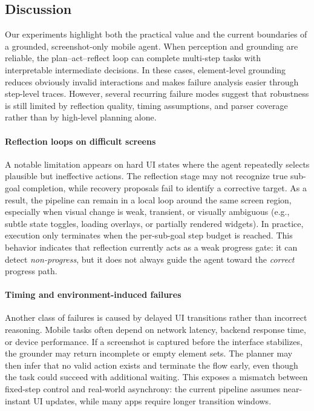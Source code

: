 \subsection{Discussion}
Our experiments highlight both the practical value and the current boundaries of a grounded, screenshot-only mobile agent. When perception and grounding are reliable, the plan--act--reflect loop can complete multi-step tasks with interpretable intermediate decisions. In these cases, element-level grounding reduces obviously invalid interactions and makes failure analysis easier through step-level traces. However, several recurring failure modes suggest that robustness is still limited by reflection quality, timing assumptions, and parser coverage rather than by high-level planning alone.

\paragraph{Reflection loops on difficult screens}
A notable limitation appears on hard UI states where the agent repeatedly selects plausible but ineffective actions. The reflection stage may not recognize true sub-goal completion, while recovery proposals fail to identify a corrective target. As a result, the pipeline can remain in a local loop around the same screen region, especially when visual change is weak, transient, or visually ambiguous (e.g., subtle state toggles, loading overlays, or partially rendered widgets). In practice, execution only terminates when the per-sub-goal step budget is reached. This behavior indicates that reflection currently acts as a weak progress gate: it can detect \emph{non-progress}, but it does not always guide the agent toward the \emph{correct} progress path.

\paragraph{Timing and environment-induced failures}
Another class of failures is caused by delayed UI transitions rather than incorrect reasoning. Mobile tasks often depend on network latency, backend response time, or device performance. If a screenshot is captured before the interface stabilizes, the grounder may return incomplete or empty element sets. The planner may then infer that no valid action exists and terminate the flow early, even though the task could succeed with additional waiting. This exposes a mismatch between fixed-step control and real-world asynchrony: the current pipeline assumes near-instant UI updates, while many apps require longer transition windows.

